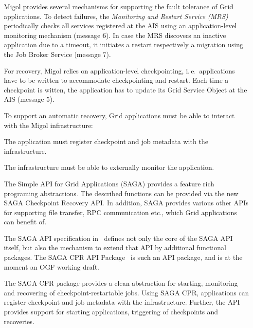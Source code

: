 \documentclass[times, 10pt,twocolumn]{article}
\begin{document}
Migol provides several mechanisms for supporting the fault tolerance of Grid applications.
To detect failures, the \emph{Monitoring and Restart Service (MRS)}
periodically checks all services registered at the AIS using an
application-level monitoring mechanism (message 6). In case the MRS discovers an inactive
application due to a timeout, it initiates a restart respectively a migration using the
Job Broker Service (message 7).  

For recovery, Migol relies on application-level checkpointing, i.\,e.\ applications have to be
written to accommodate checkpointing and restart. 
Each time a checkpoint is witten, the application has to update
its Grid Service Object at the AIS (message 5). 

To support an automatic recovery, Grid applications must be able to interact with the Migol infrastructure:
\begin{compactitem}
    \item The application must register checkpoint and job metadata with the infrastructure.
    \item The infrastructure must be able to externally monitor the application.
\end{compactitem}  
The Simple API for Grid Applications (SAGA) provides a feature rich programing abstractions. The described functions 
can be  provided via the new SAGA Checkpoint Recovery API. In addition, SAGA provides  
various other APIs for supporting file transfer, RPC communication etc., which Grid applications can benefit of.



The SAGA API specification in~\cite{saga_gfd90} defines not only the
core of the SAGA API itself, but also the mechanism to extend that API
by additional functional packages.  The SAGA CPR API
Package~\cite{saga_cpr_draft} is such an API package, and is at the
moment an OGF working draft.

The SAGA CPR package provides a clean abstraction for starting,
monitoring and recovering of checkpoint-restartable jobs.
Using SAGA CPR, applications can register checkpoint and job metadata with the infrastructure. 
Further, the API provides support for starting applications, triggering of checkpoints and recoveries.
\end{document}
